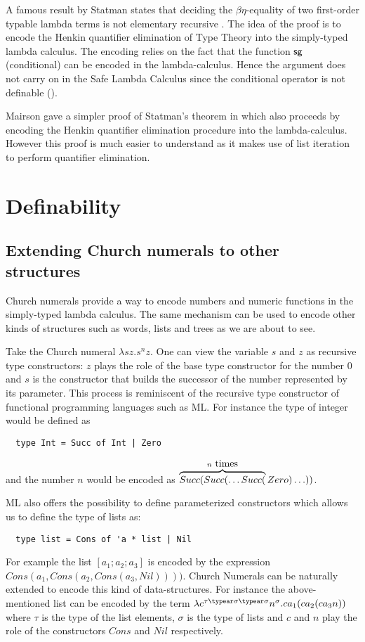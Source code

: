 \def\ie{{\it i.e.}\ }





A famous result by Statman  states that deciding the $\beta\eta$-equality of two first-order typable lambda terms is not elementary recursive \cite{Statman:1979:TLE}.
The idea of the proof is to encode the Henkin quantifier elimination of Type Theory into the simply-typed lambda calculus. The encoding relies on the fact that the function $\sf sg$ (conditional) can be encoded in the lambda-calculus. Hence the argument does not carry on   in the Safe Lambda Calculus since the conditional operator is not definable (\cite{blumong:safelambdacalculus}).

Mairson gave a simpler proof of Statman's theorem in \cite{mairson1992spt} which also proceeds by encoding the Henkin quantifier elimination procedure into the lambda-calculus. However this proof is much easier to understand as it makes use of list iteration to perform quantifier elimination.



\section{Definability}

\subsection{Extending Church numerals to other structures}
Church numerals provide a way to encode numbers and numeric
functions in the simply-typed lambda calculus. The same mechanism
can be used to encode other kinds of structures such as words, lists
and trees as we are about to see.

Take the Church numeral $\lambda s z. s^n z$. One can view the
variable $s$ and $z$ as recursive type constructors: $z$ plays the
role of the base type constructor for the number 0 and $s$ is the
constructor that builds the successor of the number represented by
its parameter. This process is reminiscent of the recursive type
constructor of functional programming languages such as ML. For
instance the type of integer would be defined as
\begin{verbatim}
  type Int = Succ of Int | Zero
\end{verbatim}
and the number $n$ would be encoded as $\overbrace{Succ(Succ( \ldots
Succ(}^{n \hbox{ times}}Zero) \ldots))$.

ML also offers the possibility to define parameterized constructors
which allows us to define the type of lists as:
\begin{verbatim}
  type list = Cons of 'a * list | Nil
\end{verbatim}
For example the list $[a_1;a_2;a_3]$ is encoded by the expression
$Cons(a_1,Cons(a_2,Cons(a_3,Nil))))$. Church Numerals can be
naturally extended to encode this kind of data-structures. For
instance the above-mentioned list can be encoded by the term
$\lambda c^{\tau\typear\sigma\typear\sigma} n^\sigma . c a_1 ( c a_2
(c a_3 n))$ where $\tau$ is the type of the list elements, $\sigma$
is the type of lists and $c$ and $n$ play the role of the
constructors $Cons$ and $Nil$ respectively.

